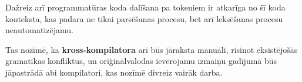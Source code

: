 Dažreiz arī programmatūras koda dalīšana pa tokeniem ir atkarīga no šī koda konteksta, kas padara ne tikai parsēšanas procesu, bet arī leksēšanas procesu neautomatizējamu. 

Tas nozīmē, ka \textbf{kross-kompilatora} arī būs jāraksta manuāli, risinot eksistējošās gramatikas konfliktus, un oriģinālvalodas ievērojamu izmaiņu gadījumā būs jāpastrādā abi kompilatori, kas nozīmē divreiz vairāk darba.
